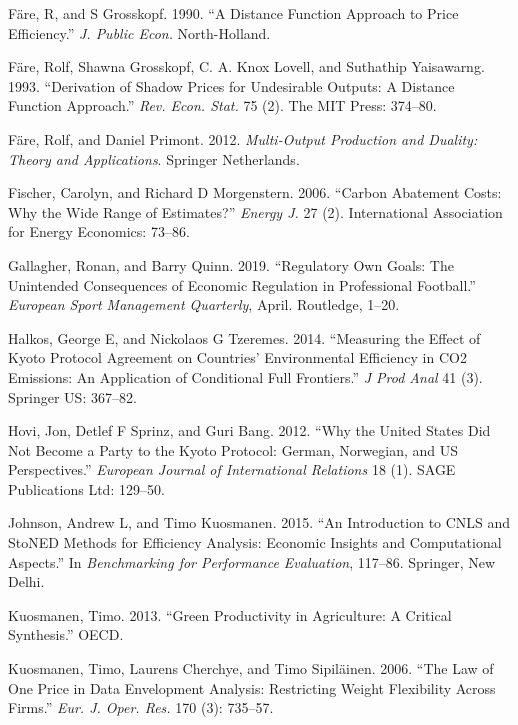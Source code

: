 \documentclass[12pt,]{article}
\begin{document}
\leavevmode\hypertarget{ref-Fare1990}{}%
Färe, R, and S Grosskopf. 1990. ``A Distance Function Approach to Price Efficiency.'' \emph{J. Public Econ.} North-Holland.

\leavevmode\hypertarget{ref-Fare1993}{}%
Färe, Rolf, Shawna Grosskopf, C. A. Knox Lovell, and Suthathip Yaisawarng. 1993. ``Derivation of Shadow Prices for Undesirable Outputs: A Distance Function Approach.'' \emph{Rev. Econ. Stat.} 75 (2). The MIT Press: 374--80.

\leavevmode\hypertarget{ref-Fare2012}{}%
Färe, Rolf, and Daniel Primont. 2012. \emph{Multi-Output Production and Duality: Theory and Applications}. Springer Netherlands.

\leavevmode\hypertarget{ref-Fischer2006}{}%
Fischer, Carolyn, and Richard D Morgenstern. 2006. ``Carbon Abatement Costs: Why the Wide Range of Estimates?'' \emph{Energy J.} 27 (2). International Association for Energy Economics: 73--86.

\leavevmode\hypertarget{ref-Gallagher2019}{}%
Gallagher, Ronan, and Barry Quinn. 2019. ``Regulatory Own Goals: The Unintended Consequences of Economic Regulation in Professional Football.'' \emph{European Sport Management Quarterly}, April. Routledge, 1--20.

\leavevmode\hypertarget{ref-Halkos2014}{}%
Halkos, George E, and Nickolaos G Tzeremes. 2014. ``Measuring the Effect of Kyoto Protocol Agreement on Countries' Environmental Efficiency in CO2 Emissions: An Application of Conditional Full Frontiers.'' \emph{J Prod Anal} 41 (3). Springer US: 367--82.

\leavevmode\hypertarget{ref-Hovi2012}{}%
Hovi, Jon, Detlef F Sprinz, and Guri Bang. 2012. ``Why the United States Did Not Become a Party to the Kyoto Protocol: German, Norwegian, and US Perspectives.'' \emph{European Journal of International Relations} 18 (1). SAGE Publications Ltd: 129--50.

\leavevmode\hypertarget{ref-Johnson2015}{}%
Johnson, Andrew L, and Timo Kuosmanen. 2015. ``An Introduction to CNLS and StoNED Methods for Efficiency Analysis: Economic Insights and Computational Aspects.'' In \emph{Benchmarking for Performance Evaluation}, 117--86. Springer, New Delhi.

\leavevmode\hypertarget{ref-Kuosmanen2013}{}%
Kuosmanen, Timo. 2013. ``Green Productivity in Agriculture: A Critical Synthesis.'' OECD.

\leavevmode\hypertarget{ref-Kuosmanen2006}{}%
Kuosmanen, Timo, Laurens Cherchye, and Timo Sipiläinen. 2006. ``The Law of One Price in Data Envelopment Analysis: Restricting Weight Flexibility Across Firms.'' \emph{Eur. J. Oper. Res.} 170 (3): 735--57.
\end{document}
